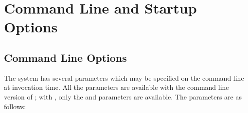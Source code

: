 %
%
%
%
%
\chapter{Command Line and Startup Options}
\section{Command Line Options}

The {\eclipse} system has several parameters which may be specified on the
command line at invocation time. All the parameters are available with
the command line version of ; with , only the 
and 
parameters are available.
The parameters are as follows:

